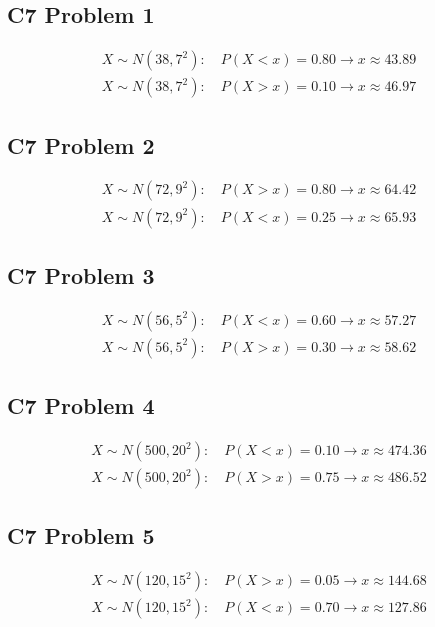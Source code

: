 	\subsection{C7 Problem 1}
	\[
	\begin{array}{l}
	X\sim N(38,7^2):\quad P(X<x)=0.80 \longrightarrow x\approx 43.89\\
	X\sim N(38,7^2):\quad P(X>x)=0.10 \longrightarrow x\approx 46.97
	\end{array}
	\]

	\subsection{C7 Problem 2}
	\[
	\begin{array}{l}
	X\sim N(72,9^2):\quad P(X>x)=0.80 \longrightarrow x\approx 64.42\\
	X\sim N(72,9^2):\quad P(X<x)=0.25 \longrightarrow x\approx 65.93
	\end{array}
	\]

	\subsection{C7 Problem 3}
	\[
	\begin{array}{l}
	X\sim N(56,5^2):\quad P(X<x)=0.60 \longrightarrow x\approx 57.27\\
	X\sim N(56,5^2):\quad P(X>x)=0.30 \longrightarrow x\approx 58.62
	\end{array}
	\]

	\subsection{C7 Problem 4}
	\[
	\begin{array}{l}
	X\sim N(500,20^2):\quad P(X<x)=0.10 \longrightarrow x\approx 474.36\\
	X\sim N(500,20^2):\quad P(X>x)=0.75 \longrightarrow x\approx 486.52
	\end{array}
	\]

	\subsection{C7 Problem 5}
	\[
	\begin{array}{l}
	X\sim N(120,15^2):\quad P(X>x)=0.05 \longrightarrow x\approx 144.68\\
	X\sim N(120,15^2):\quad P(X<x)=0.70 \longrightarrow x\approx 127.86
	\end{array}
	\]

